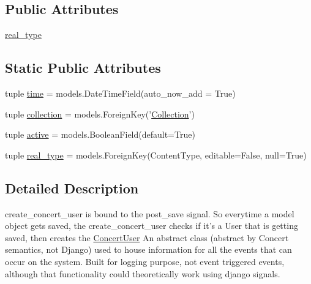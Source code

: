 \subsection*{Public Attributes}
\begin{DoxyCompactItemize}
\item 
\hyperlink{classconcertapp_1_1models_1_1_event_abf8022ffd48de8f0c571618d2f400a40}{real\_\-type}
\end{DoxyCompactItemize}
\subsection*{Static Public Attributes}
\begin{DoxyCompactItemize}
\item 
tuple \hyperlink{classconcertapp_1_1models_1_1_event_a7cb39acb85efc48124f09e01d2f44e72}{time} = models.DateTimeField(auto\_\-now\_\-add = True)
\item 
tuple \hyperlink{classconcertapp_1_1models_1_1_event_af9838ff8a95204a05e4ab4d9af554de4}{collection} = models.ForeignKey('\hyperlink{classconcertapp_1_1models_1_1_collection}{Collection}')
\item 
tuple \hyperlink{classconcertapp_1_1models_1_1_event_a6d8e5e726942e88d3380d90d1aff01a1}{active} = models.BooleanField(default=True)
\item 
tuple \hyperlink{classconcertapp_1_1models_1_1_event_a09aa543cdca26eb385fbf2fa2a2ffa53}{real\_\-type} = models.ForeignKey(ContentType, editable=False, null=True)
\end{DoxyCompactItemize}


\subsection{Detailed Description}
create\_\-concert\_\-user is bound to the post\_\-save signal. So everytime a model object gets saved, the create\_\-concert\_\-user checks if it's a User that is getting saved, then creates the \hyperlink{classconcertapp_1_1models_1_1_concert_user}{ConcertUser} An abstract class (abstract by Concert semantics, not Django) used to house information for all the events that can occur on the system. Built for logging purpose, not event triggered events, although that functionality could theoretically work using django signals. 

